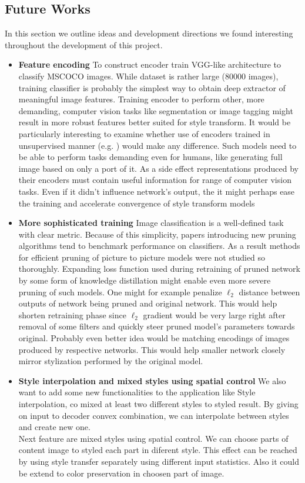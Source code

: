 \documentclass[../Main.tex]{subfiles}
\begin{document}
\subsection{Future Works}
In this section we outline ideas and development directions we found interesting
throughout the development of this project.
\begin{itemize}
\item \textbf{Feature encoding}
    To construct encoder \cite{Li2018} train VGG-like architecture to classify 
    MSCOCO images. While dataset is rather large (80000 images), training classifier
    is probably the simplest way to obtain deep extractor of meaningful image features.
    Training encoder to perform other, more demanding, computer vision tasks like 
    segmentation or image tagging might result in more robust features better suited
    for style transform. It would be particularly interesting to examine whether use of encoders
    trained in unsupervised manner (e.g. \cite{CPC, CPCv2}) would make any difference.
    Such models need to be able to perform tasks demanding even for humans, like generating
    full image based on only a port of it. As a side effect representations produced by their
    encoders must contain useful information for range of computer vision tasks.
    Even if it didn't influence network's output, the it might perhaps ease the training
    and accelerate convergence of style transform models
\item \textbf{More sophisticated training}
    Image classification is a well-defined task with clear metric.
    Because of this simplicity, papers introducing new pruning algorithms tend to 
    benchmark performance on classifiers. As a result methods for efficient pruning of
    picture to picture models were not studied so thoroughly. Expanding loss function used during
    retraining of pruned network by some form of knowledge distillation might enable
    even more severe pruning of such models. One might for example penalize $\ell_2$
    distance between outputs of network being pruned and original network.
    This would help shorten retraining phase since $\ell_2$ gradient
    would be very large right after removal of some filters and quickly steer pruned
    model's parameters towards original. Probably even better idea would be matching
    encodings of images produced by respective networks. This would help
    smaller network closely mirror stylization performed by the original model.
\item \textbf{Style interpolation and mixed styles using spatial control}
    We also want to add some new functionalities to the application like Style interpolation, co mixed at least two different styles to styled result. By giving on input to decoder convex combination, we can interpolate between styles and create new one. \\
    Next feature are mixed styles using spatial control. We can choose parts of content image to styled each part in diferent style. This effect can be reached by using style transfer separately using different input statistics. Also it could be extend to color preservation in choosen part of image.
\end{itemize}

\biblio %
\end{document}
